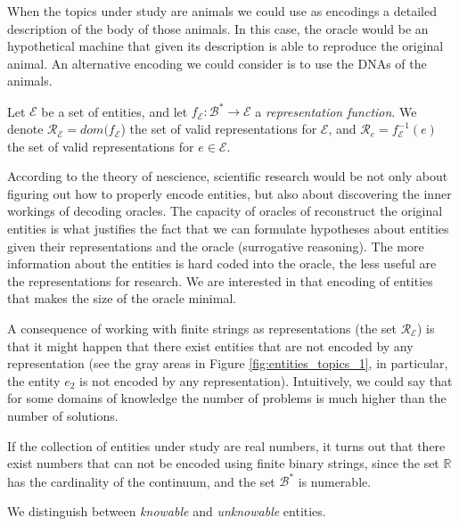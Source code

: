 \begin{example}
When the topics under study are animals we could use as encodings a detailed description of the body of those animals. In this case, the oracle would be an hypothetical machine that given its description is able to reproduce the original animal. An alternative encoding we could consider is to use the DNAs of the animals.
\end{example}

\begin{notation}
Let $\mathcal{E}$ be a set of entities, and let $f_\mathcal{E}:\mathcal{B}^\ast \rightarrow \mathcal{E}$ a \emph{representation function}. We denote $\mathcal{R}_\mathcal{E} = dom(f_\mathcal{E}$) the set of valid representations for $\mathcal{E}$, and $\mathcal{R}_e = f_\mathcal{E}^{-1}(e)$ the set of valid representations for $e \in \mathcal{E}$.
\end{notation}

According to the theory of nescience, scientific research would be not only about figuring out how to properly encode entities, but also about discovering the inner workings of decoding oracles. The capacity of oracles of reconstruct the original entities is what justifies the fact that we can formulate hypotheses about entities given their representations and the oracle (surrogative reasoning). The more information about the entities is hard coded into the oracle, the less useful are the representations for research. We are interested in that encoding of entities that makes the size of the oracle minimal.

A consequence of working with finite strings as representations (the set $\mathcal{R}_\mathcal{E}$) is that it might happen that there exist entities that are not encoded by any representation (see the gray areas in Figure \ref{fig:entities_topics_1}, in particular, the entity $e_2$ is not encoded by any representation). Intuitively, we could say that for some domains of knowledge the number of problems is much higher than the number of solutions.

\begin{example}
If the collection of entities under study are real numbers, it turns out that there exist numbers that can not be encoded using finite binary strings, since the set $\mathbb{R}$ has the cardinality of the continuum, and the set $\mathcal{B}^\ast$ is numerable.
\end{example}

We distinguish between \emph{knowable} and \emph{unknowable} entities.

